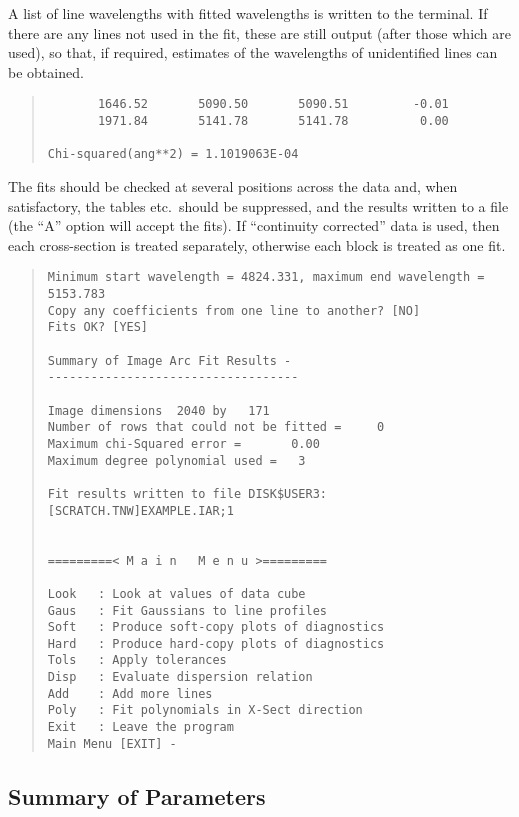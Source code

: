 A list of line wavelengths with fitted wavelengths is written to
the terminal. If there are any lines not used in the fit, these are
still output (after those which are used), so that, if required,
estimates of the wavelengths of unidentified lines can be obtained.
\begin{quote}\begin{verbatim}
       1646.52       5090.50       5090.51         -0.01
       1971.84       5141.78       5141.78          0.00

Chi-squared(ang**2) = 1.1019063E-04
\end{verbatim}\end{quote}
The fits should be checked at several positions across the data and,
when satisfactory, the tables etc.\ should be suppressed, and the
results written to a file (the ``A'' option will accept the fits).
If ``continuity corrected'' data is used, then each cross-section is
treated separately, otherwise each block is treated as one fit.
\begin{quote}\begin{verbatim}
Minimum start wavelength = 4824.331, maximum end wavelength = 5153.783
Copy any coefficients from one line to another? [NO]
Fits OK? [YES]
 
Summary of Image Arc Fit Results -
-----------------------------------
 
Image dimensions  2040 by   171
Number of rows that could not be fitted =     0
Maximum chi-Squared error =       0.00
Maximum degree polynomial used =   3
 
Fit results written to file DISK$USER3:[SCRATCH.TNW]EXAMPLE.IAR;1
 
 
=========< M a i n   M e n u >=========
 
Look   : Look at values of data cube
Gaus   : Fit Gaussians to line profiles
Soft   : Produce soft-copy plots of diagnostics
Hard   : Produce hard-copy plots of diagnostics
Tols   : Apply tolerances
Disp   : Evaluate dispersion relation
Add    : Add more lines
Poly   : Fit polynomials in X-Sect direction
Exit   : Leave the program
Main Menu [EXIT] -
\end{verbatim}\end{quote}

\subsection{Summary of Parameters}

